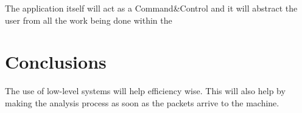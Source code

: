 The application itself will act as a Command\&Control and it will abstract the
user from all the work being done within the


\section{Conclusions}
\label{chap3:sec:concs}
The use of low-level systems will help efficiency wise. This will also help by
making the analysis process as soon as the packets arrive to the machine.
